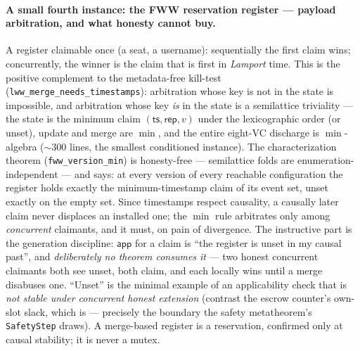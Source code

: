 \documentclass[11pt]{article}
\newcommand{\lean}[1]{\texttt{#1}}
\newcommand{\app}{\mathsf{app}}
\begin{document}
\paragraph{A small fourth instance: the FWW reservation register --- payload
arbitration, and what honesty cannot buy.} A register claimable once (a
seat, a username): sequentially the first claim wins; concurrently, the
winner is the claim that is first in \emph{Lamport} time. This is the
positive complement to the metadata-free kill-test
(\lean{lww\_merge\_needs\_timestamps}): arbitration whose key is not in the
state is impossible, and arbitration whose key \emph{is} in the state is a
semilattice triviality --- the state is the minimum claim
$(\mathsf{ts}, \mathsf{rep}, v)$ under the lexicographic order (or unset),
update and merge are $\min$, and the entire eight-VC discharge is
$\min$-algebra (${\sim}300$ lines, the smallest conditioned instance). The
characterization theorem (\lean{fww\_version\_min}) is honesty-free ---
semilattice folds are enumeration-independent --- and says: at every
version of every reachable configuration the register holds exactly the
minimum-timestamp claim of its event set, unset exactly on the empty set.
Since timestamps respect causality, a causally later claim never displaces
an installed one; the $\min$ rule arbitrates only among \emph{concurrent}
claimants, and it must, on pain of divergence. The instructive part is the
generation discipline: $\app$ for a claim is ``the register is unset in my
causal past'', and \emph{deliberately no theorem consumes it} --- two
honest concurrent claimants both see unset, both claim, and each locally
wins until a merge disabuses one. ``Unset'' is the minimal example of an
applicability check that is \emph{not stable under concurrent honest
extension} (contrast the escrow counter's own-slot slack, which is ---
precisely the boundary the safety metatheorem's \lean{SafetyStep} draws).
A merge-based register is a reservation, confirmed only at causal
stability; it is never a mutex.
\end{document}
